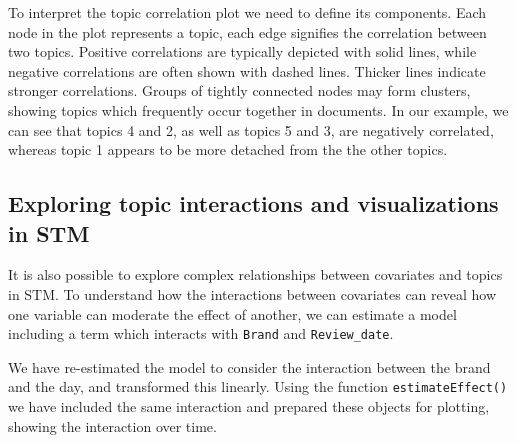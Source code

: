 To interpret the topic correlation plot we need to define its
components. Each node in the plot represents a topic, each edge
signifies the correlation between two topics. Positive correlations are
typically depicted with solid lines, while negative correlations are
often shown with dashed lines. Thicker lines indicate stronger
correlations. Groups of tightly connected nodes may form clusters,
showing topics which frequently occur together in documents. In our example,
we can see that topics 4 and 2, as well as topics 5 and 3, are negatively
correlated, whereas topic 1 appears to be more detached from the the other
topics.

\subsection{Exploring topic interactions and visualizations in
STM}\label{exploring-topic-interactions-and-visualizations-in-stm}

It is also possible to explore complex relationships between covariates and topics in
STM. To understand how the interactions between covariates can
reveal how one variable can moderate the effect of another, we can estimate a
model including a term which interacts with \texttt{Brand} and
\texttt{Review\_date}.

\begin{Shaded}
\begin{Highlighting}[]
\OtherTok{\textless{}{-}} \SpecialCharTok{$}\SpecialCharTok{$} \NormalTok{,}
\SpecialCharTok{\textasciitilde{}}\SpecialCharTok{*} \NormalTok{, }\SpecialCharTok{$}
 \NormalTok{, } \NormalTok{)}
\end{Highlighting}
\end{Shaded}

We have re-estimated the model to consider the interaction between the brand
and the day, and transformed this linearly. Using the function
\texttt{estimateEffect()} we have included the same interaction and prepared
these objects for plotting, showing the interaction over time.

